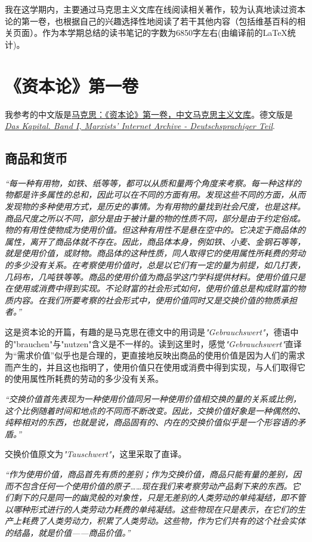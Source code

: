 \documentclass[a4paper]{article}
\begin{document}
\courseheader
{}
我在这学期内，主要通过马克思主义文库在线阅读相关著作，较为认真地读过资本论的第一卷，也根据自己的兴趣选择性地阅读了若干其他内容（包括维基百科的相关页面）。作为本学期总结的读书笔记的字数为6850字左右(由编译前的\LaTeX 统计)。
\section{《资本论》第一卷}
我参考的中文版是\href{https://www.marxists.org/chinese/marx-engels/23/index.htm}{马克思：《资本论》第一卷，中文马克思主义文库}。德文版是\emph{\href{http://www.mlwerke.de/me/me23/me23_000.htm}{Das Kapital. Band I, Marxists’ Internet Archive - Deutschsprachiger Teil}}.
\subsection{商品和货币}
\emph{“每一种有用物，如铁、纸等等，都可以从质和量两个角度来考察。每一种这样的物都是许多属性的总和，因此可以在不同的方面有用。发现这些不同的方面，从而发现物的多种使用方式，是历史的事情。为有用物的量找到社会尺度，也是这样。商品尺度之所以不同，部分是由于被计量的物的性质不同，部分是由于约定俗成。物的有用性使物成为使用价值。但这种有用性不是悬在空中的。它决定于商品体的属性，离开了商品体就不存在。因此，商品体本身，例如铁、小麦、金钢石等等，就是使用价值，或财物。商品体的这种性质，同人取得它的使用属性所耗费的劳动的多少没有关系。在考察使用价值时，总是以它们有一定的量为前提，如几打表，几码布，几吨铁等等。商品的使用价值为商品学这门学科提供材料。使用价值只是在使用或消费中得到实现。不论财富的社会形式如何，使用价值总是构成财富的物质内容。在我们所要考察的社会形式中，使用价值同时又是交换价值的物质承担者。”}

这是资本论的开篇，有趣的是马克思在德文中的用词是\emph{"Gebrauchswert"}，德语中的"brauchen"与"nutzen"含义是不一样的。读到这里时，感觉\emph{"Gebrauchswert"}直译为“需求价值”似乎也是合理的，更直接地反映出商品的使用价值是因为人们的需求而产生的，并且这也指明了，使用价值只在使用或消费中得到实现，与人们取得它的使用属性所耗费的劳动的多少没有关系。

\emph{“交换价值首先表现为一种使用价值同另一种使用价值相交换的量的关系或比例，这个比例随着时间和地点的不同而不断改变。因此，交换价值好象是一种偶然的、纯粹相对的东西，也就是说，商品固有的、内在的交换价值似乎是一个形容语的矛盾。”}

交换价值原文为\emph{"Tauschwert"}，这里采取了直译。

\emph{“作为使用价值，商品首先有质的差别；作为交换价值，商品只能有量的差别，因而不包含任何一个使用价值的原子……现在我们来考察劳动产品剩下来的东西。它们剩下的只是同一的幽灵般的对象性，只是无差别的人类劳动的单纯凝结，即不管以哪种形式进行的人类劳动力耗费的单纯凝结。这些物现在只是表示，在它们的生产上耗费了人类劳动力，积累了人类劳动。这些物，作为它们共有的这个社会实体的结晶，就是价值——商品价值。”}
\end{document}

